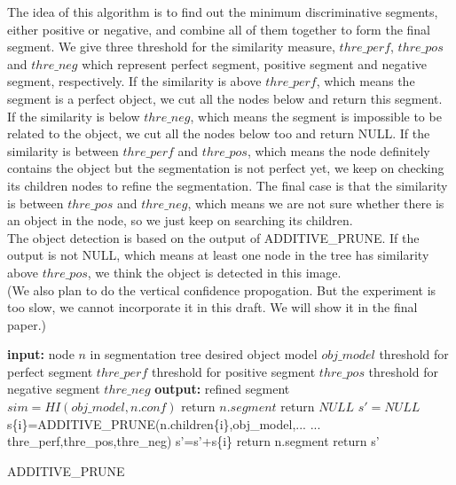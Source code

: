 \documentclass[10pt,twocolumn,letterpaper]{article}
\begin{document}
The idea of this algorithm is to find out the minimum discriminative segments, either positive or negative, and combine all of them together to form the final segment. We give three threshold for the similarity measure, $thre\_perf$, $thre\_pos$ and $thre\_neg$ which represent perfect segment, positive segment and negative segment, respectively. If the similarity is above $thre\_perf$, which means the segment is a perfect object, we cut all the nodes below and return this segment. If the similarity is below $thre\_neg$, which means the segment is impossible to be related to the object, we cut all the nodes below too and return NULL. If the similarity is between $thre\_perf$ and $thre\_pos$, which means the node definitely contains the object but the segmentation is not perfect yet, we keep on checking its children nodes to refine the segmentation. The final case is that the similarity is between $thre\_pos$ and $thre\_neg$, which means we are not sure whether there is an object in the node, so we just keep on searching its children. \\

The object detection is based on the output of ADDITIVE\_PRUNE. If the output is not NULL, which means at least one node in the tree has similarity above $thre\_pos$, we think the object is detected in this image.\\ 

(We also plan to do the vertical confidence propogation. But the experiment is too slow, we cannot incorporate it in this draft. We will show it in the final paper.)\\


\begin{algorithm}
\begin{algorithmic}
  \STATE \textbf{input:} 
  \STATE \hspace{3 mm} node $n$ in segmentation tree
  \STATE \hspace{3 mm} desired object model $obj\_model$
  \STATE \hspace{3 mm} threshold for perfect segment $thre\_perf$
  \STATE \hspace{3 mm} threshold for positive segment $thre\_pos$
  \STATE \hspace{3 mm} threshold for negative segment $thre\_neg$
  \STATE \textbf{output:} 
  \STATE \hspace{3 mm} refined segment 
  \STATE
  \STATE $sim=HI(obj\_model,n.conf)$
    \STATE return $n.segment$
  \ENDIF
    \STATE return $NULL$
  \ENDIF
  \STATE $s'=NULL$
    \STATE s\{i\}=ADDITIVE\_PRUNE(n.children\{i\},obj\_model,...
    \STATE ... thre\_perf,thre\_pos,thre\_neg)
    \STATE s'=s'+s\{i\}
  \ENDFOR
    \STATE return n.segment
  \ELSE
    \STATE return s'
  \ENDIF
\end{algorithmic}
\caption{ADDITIVE\_PRUNE}
\label{alg:add_prun}
\end{algorithm}
 
\end{document}
